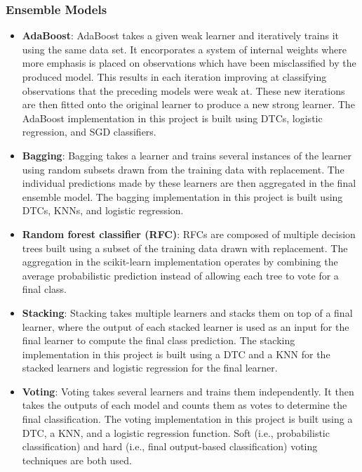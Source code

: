 \documentclass[10pt,sigconf,letterpaper,nonacm]{acmart}
\begin{document}
\subsubsection{Ensemble Models}

\begin{itemize}
  \item \textbf{AdaBoost}: AdaBoost takes a given weak learner and iteratively trains it using the same data set.
  It encorporates a system of internal weights where more emphasis is placed on observations which have been misclassified by the produced model.
  This results in each iteration improving at classifying observations that the preceding models were weak at.
  These new iterations are then fitted onto the original learner to produce a new strong learner.
  The AdaBoost implementation in this project is built using DTCs, logistic regression, and SGD classifiers.

  \item \textbf{Bagging}: Bagging takes a learner and trains several instances of the learner using random subsets drawn from the training data with replacement.
  The individual predictions made by these learners are then aggregated in the final ensemble model.
  The bagging implementation in this project is built using DTCs, KNNs, and logistic regression.

  \item \textbf{Random forest classifier (RFC)}: RFCs are composed of multiple decision trees built using a subset of the training data drawn with replacement.
  The aggregation in the scikit-learn implementation operates by combining the average probabilistic prediction instead of allowing each tree to vote for a final class.
  
  \item \textbf{Stacking}: Stacking takes multiple learners and stacks them on top of a final learner, where the output of each stacked learner is used as an input for the final learner to compute the final class prediction.
  The stacking implementation in this project is built using a DTC and a KNN for the stacked learners and logistic regression for the final learner.

  \item \textbf{Voting}: Voting takes several learners and trains them independently.
  It then takes the outputs of each model and counts them as votes to determine the final classification.
  The voting implementation in this project is built using a DTC, a KNN, and a logistic regression function.
  Soft (i.e., probabilistic classification) and hard (i.e., final output-based classification) voting techniques are both used.
\end{itemize}
\end{document}
